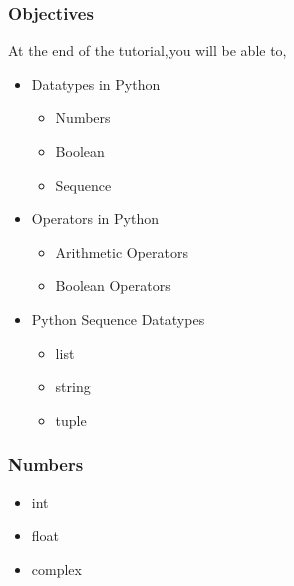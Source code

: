 \documentclass[presentation]{beamer}
\begin{document}
\begin{frame}
\frametitle{Objectives}
\label{sec-2}

 At the end of the tutorial,you will be able to, 
\begin{itemize}

\item Datatypes in Python
\label{sec-2_1}%
\begin{itemize}

\item Numbers\\
\label{sec-2_1_1}%
\item Boolean\\
\label{sec-2_1_2}%
\item Sequence\\
\label{sec-2_1_3}%
\end{itemize} %

\item Operators in Python
\label{sec-2_2}%
\begin{itemize}

\item Arithmetic Operators\\
\label{sec-2_2_1}%
\item Boolean Operators\\
\label{sec-2_2_2}%
\end{itemize} %

\item Python Sequence Datatypes
\label{sec-2_3}%
\begin{itemize}

\item list\\
\label{sec-2_3_1}%
\item string\\
\label{sec-2_3_2}%
\item tuple\\
\label{sec-2_3_3}%
\end{itemize} %
\end{itemize} %
\end{frame}
\begin{frame}
\frametitle{Numbers}
\label{sec-3}


\begin{itemize}
\item int
\item float
\item complex
\end{itemize}
\end{frame}
\end{document}
